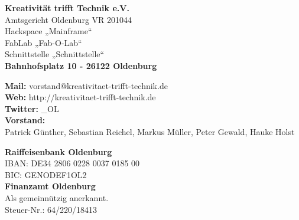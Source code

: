 \vfill

\begin{multicols}{3}
\footnotesize
\textbf{Kreativität trifft Technik e.V.}\\
Amtsgericht Oldenburg VR 201044\\[0.2cm]
Hackspace „Mainframe“\\
FabLab „Fab-O-Lab“\\
Schnittstelle „Schnittstelle“\\[0.2cm]
\textbf{Bahnhofsplatz 10 - 26122 Oldenburg}
 
\columnbreak

\textbf{Mail:} vorstand@kreativitaet-trifft-technik.de\\
\textbf{Web:} http://kreativitaet-trifft-technik.de\\
\textbf{Twitter:} \@KtT\_OL\\[0.4cm]
\textbf{Vorstand:}\\
Patrick Günther, Sebastian Reichel, Markus Müller,
Peter Gewald, Hauke Holst

\columnbreak

\textbf{Raiffeisenbank Oldenburg}\\
IBAN: DE34 2806 0228 0037 0185 00\\
BIC: GENODEF1OL2\\[0.4cm]
\textbf{Finanzamt Oldenburg}\\
Als gemeinnützig anerkannt.\\
Steuer-Nr.: 64/220/18413\\

\end{multicols}